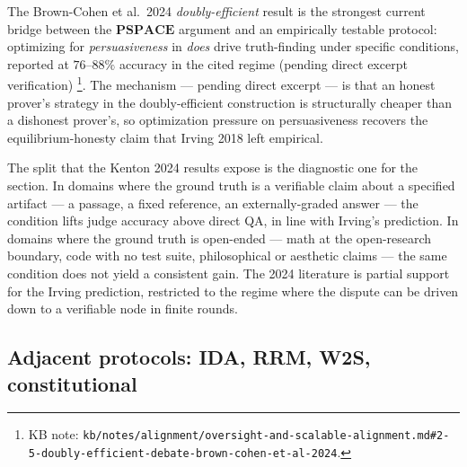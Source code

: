 The Brown-Cohen et al.\ 2024 \emph{doubly-efficient } result
 is the strongest current bridge between the
$\mathbf{PSPACE}$ argument and an empirically testable protocol:
optimizing for \emph{persuasiveness} in  \emph{does} drive
truth-finding under specific conditions, reported at $76$--$88\%$
accuracy in the cited regime (pending direct excerpt verification)%
\footnote{KB note: \nolinkurl{kb/notes/alignment/oversight-and-scalable-alignment.md#2-5-doubly-efficient-debate-brown-cohen-et-al-2024}.}.
The mechanism --- pending direct excerpt --- is that an honest %
prover's strategy in the doubly-efficient construction is structurally
cheaper than a dishonest prover's, so optimization pressure on
persuasiveness recovers the equilibrium-honesty claim that Irving
2018 left empirical.

The split that the Kenton 2024 results expose is the diagnostic one
for the section. In domains where the ground truth is a verifiable
claim about a specified artifact --- a passage, a fixed reference, an
externally-graded answer --- the  condition lifts judge
accuracy above direct QA, in line with Irving's prediction. In domains
where the ground truth is open-ended --- math at the open-research
boundary, code with no test suite, philosophical or aesthetic claims
--- the same condition does not yield a consistent gain. The 2024
literature is partial support for the Irving prediction, restricted
to the regime where the dispute can be driven down to a verifiable
node in finite rounds.

\subsection{Adjacent protocols: IDA, RRM, W2S, constitutional}
\label{sec:oversight-adjacent}

